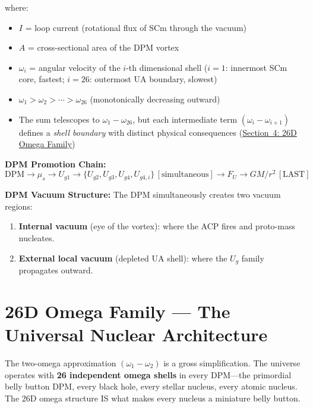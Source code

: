 \documentclass[12pt,a4paper]{article}
\begin{document}
where:
\begin{itemize}[noitemsep]
  \item $I$ = loop current (rotational flux of SCm through the vacuum)
  \item $A$ = cross-sectional area of the DPM vortex
  \item $\omega_i$ = angular velocity of the $i$-th dimensional shell
    ($i=1$: innermost SCm core, fastest; $i=26$: outermost UA boundary, slowest)
  \item $\omega_1 > \omega_2 > \cdots > \omega_{26}$ (monotonically decreasing outward)
  \item The sum telescopes to $\omega_1 - \omega_{26}$, but each intermediate term
    $(\omega_i - \omega_{i+1})$ defines a \emph{shell boundary} with distinct
    physical consequences (\hyperref[sec:26d_nuclear]{Section~4: 26D Omega Family})
\end{itemize}

\noindent\textbf{DPM Promotion Chain:}
\begin{equation}
  \text{DPM} \to \mu_s \to U_{g1}
  \to \{U_{g2}, U_{g3}, U_{g4}, U_{g4,i}\}\,[\text{simultaneous}]
  \to F_U \to GM/r^2\,[\text{LAST}]
  \label{eq:dpm_chain}
\end{equation}

\noindent\textbf{DPM Vacuum Structure:}
The DPM simultaneously creates two vacuum regions:
\begin{enumerate}[noitemsep]
  \item \textbf{Internal vacuum} (eye of the vortex): where the ACP fires and
    proto-mass nucleates.
  \item \textbf{External local vacuum} (depleted UA shell): where the $U_g$ family
    propagates outward.
\end{enumerate}

\section{26D Omega Family --- The Universal Nuclear Architecture}
\label{sec:26d_nuclear}

The two-omega approximation $(\omega_1 - \omega_2)$ is a gross simplification.
The universe operates with \textbf{26 independent omega shells} in every
DPM---the primordial belly button DPM, every black hole, every stellar nucleus,
every atomic nucleus.  The 26D omega structure IS what makes every nucleus a
miniature belly button.
\end{document}
